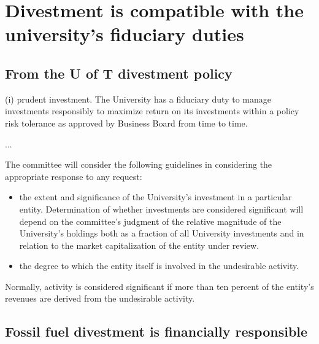 \documentclass[10pt]{article}
\newenvironment{itquote}{%
  \quote
  \itshape
}{%
  \endquote
}
\begin{document}
\clearpage



		\singlespacing
		\section {Divestment is compatible with the university's fiduciary duties}
		\label{sec:Fiduciary}
		\doublespacing
		





		\subsection {From the U of T divestment policy}
		
		
		
\begin{itquote}    
(i) prudent investment. The University has a fiduciary duty to manage investments responsibly to maximize return on its investments within a policy risk tolerance as approved by Business Board from time to time.

...

The committee will consider the following guidelines in considering the appropriate response to any request:
\begin{itemize}
  \item the extent and significance of the University's investment in a particular entity. Determination of whether investments are considered significant will depend on the committee's judgment of the relative magnitude of the University's holdings both as a fraction of all University investments and in relation to the market capitalization of the entity under review.
  \item the degree to which the entity itself is involved in the undesirable activity.
\end{itemize}
Normally, activity is considered significant if more than ten percent of the entity's revenues are derived from the undesirable activity.
\end{itquote}



	\subsection{Fossil fuel divestment is financially responsible}

	
\end{document}
